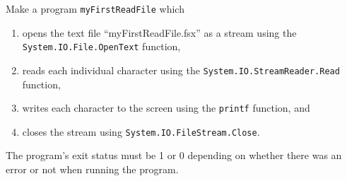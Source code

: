 Make a program \lstinline{myFirstReadFile} which
\begin{enumerate}
\item opens the text file ``myFirstReadFile.fsx'' as a stream using the
  \lstinline{System.IO.File.OpenText} function,
\item reads each individual character using the
  \lstinline{System.IO.StreamReader.Read} function,
\item writes each character to the screen using the \lstinline{printf}
  function, and
\item closes the stream using \lstinline{System.IO.FileStream.Close}.
\end{enumerate}
The program's exit status must be 1 or 0 depending on whether there
was an error or not when running the program.
